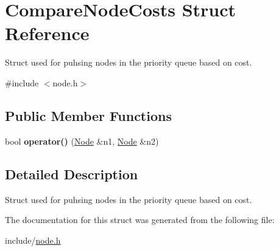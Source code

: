 \hypertarget{struct_compare_node_costs}{}\section{Compare\+Node\+Costs Struct Reference}
\label{struct_compare_node_costs}


Struct used for puhsing nodes in the priority queue based on cost.  




{\ttfamily \#include $<$node.\+h$>$}

\subsection*{Public Member Functions}
\begin{DoxyCompactItemize}
\item 
\mbox{\label{struct_compare_node_costs_aa892f1b0a6705fa15224701bf4f52e40}} 
bool {\bfseries operator()} (\hyperlink{class_node}{Node} \&n1, \hyperlink{class_node}{Node} \&n2)
\end{DoxyCompactItemize}


\subsection{Detailed Description}
Struct used for puhsing nodes in the priority queue based on cost. 

The documentation for this struct was generated from the following file\+:\begin{DoxyCompactItemize}
\item 
include/\hyperlink{node_8h}{node.\+h}\end{DoxyCompactItemize}
